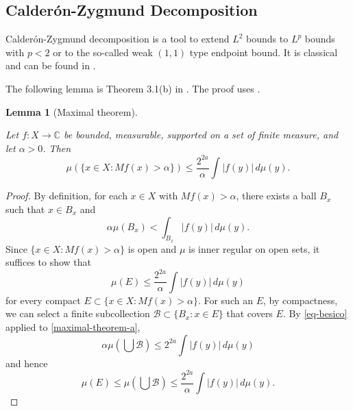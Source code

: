 \documentclass[10pt,a4paper]{article}
\theoremstyle{plain}
\newtheorem{lemma}[theorem]{Lemma}
\theoremstyle{definition}
\numberwithin{equation}{subsection}
\newcommand{\lean}[1]{}
\newcommand{\uses}[1]{}
\newcommand{\leanok}{}
\def\C{\mathbb{C}}
\begin{document}
\subsection{Calder\'on-Zygmund Decomposition}
\label{subsec-CZD}
Calder\'on-Zygmund decomposition is a tool to extend $L^2$ bounds to $L^p$ bounds with $p<2$ or to the so-called weak $(1, 1)$ type endpoint bound.
It is classical and can be found in \cite{stein-book}.

The following lemma is Theorem 3.1(b) in \cite{stein-book}. The proof uses .
\begin{lemma}[Maximal theorem]
    \label{maximal-theorem}
    \leanok
    \lean{maximal_theorem}
    \uses{Hardy-Littlewood}
    Let $f: X \to \C$ be bounded, measurable, supported on a set of finite measure, and let $\alpha > 0$. Then
    \begin{equation}
        \label{maximal-theorem-equation}
        \mu(\{x\in X : Mf(x) > \alpha\}) \le \frac{2^{2a}}{\alpha} \int |f(y)|\, d\mu(y).
    \end{equation}
\end{lemma}
\begin{proof}
    \leanok
    By definition, for each $x\in X$ with $Mf(x) > \alpha$, there exists a ball $B_x$ such that $x\in B_x$ and
    \begin{equation}
        \label{maximal-theorem-a}
        \alpha \mu(B_x) < \int_{B_x} |f(y)|\, d\mu(y).
    \end{equation}
    Since $\{x\in X : Mf(x) > \alpha\}$ is open and $\mu$ is inner regular on open sets, it suffices to show that
    \begin{equation*}
        \mu(E) \le \frac{2^{2a}}{\alpha} \int |f(y)|\, d\mu(y)
    \end{equation*}
    for every compact $E\subset \{x\in X : Mf(x) > \alpha\}$.
    For such an $E$, by compactness, we can select a finite subcollection $\mathcal{B} \subset \{B_x: x\in E\}$ that covers $E$.
    By \eqref{eq-besico} applied to \eqref{maximal-theorem-a},
    \begin{equation}
        \alpha \mu(\bigcup \mathcal{B}) \le 2^{2a} \int |f(y)|\,d\mu(y)
    \end{equation}
    and hence
    \begin{equation*}
        \mu(E) \le \mu(\bigcup \mathcal{B}) \le \frac{2^{2a}}{\alpha} \int |f(y)|\,d\mu(y).
    \end{equation*}
\end{proof}
\end{document}

